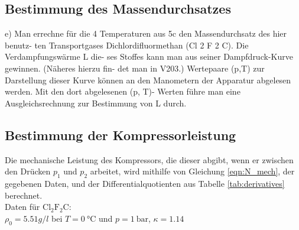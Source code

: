\subsection{Bestimmung des Massendurchsatzes} %
e) Man errechne für die 4 Temperaturen aus 5c den Massendurchsatz des hier benutz-
ten Transportgases Dichlordifluormethan (Cl 2 F 2 C). Die Verdampfungswärme L die-
ses Stoffes kann man aus seiner Dampfdruck-Kurve gewinnen. (Näheres hierzu fin-
det man in V203.) Wertepaare (p,T) zur Darstellung dieser Kurve können an den
Manometern der Apparatur abgelesen werden. Mit den dort abgelesenen (p, T)-
Werten führe man eine Ausgleichsrechnung zur Bestimmung von L durch.

\subsection{Bestimmung der Kompressorleistung} %
Die mechanische Leistung des Kompressors, die dieser abgibt, wenn
er zwischen den Drücken $p_1$ und $p_2$ arbeitet,
wird mithilfe von Gleichung \ref{eqn:N_mech}, der gegebenen Daten, und der Differentialquotienten aus Tabelle \ref{tab:derivatives} berechnet.
\ \\
Daten für $\mathrm{Cl}_2 \mathrm{F}_2 \mathrm{C}$: \\
$ρ_0 = \SI{5.51} g/l$ bei $T = \SI{0}{\celsius}$ und $p = \SI{1}{\bar}$, $κ = 1.14$


